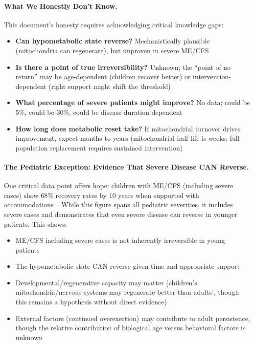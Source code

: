 \paragraph{What We Honestly Don't Know.}

This document's honesty requires acknowledging critical knowledge gaps:

\begin{itemize}
    \item \textbf{Can hypometabolic state reverse?} Mechanistically plausible (mitochondria can regenerate), but unproven in severe ME/CFS

    \item \textbf{Is there a point of true irreversibility?} Unknown; the ``point of no return'' may be age-dependent (children recover better) or intervention-dependent (right support might shift the threshold)

    \item \textbf{What percentage of severe patients might improve?} No data; could be 5\%, could be 30\%, could be disease-duration dependent

    \item \textbf{How long does metabolic reset take?} If mitochondrial turnover drives improvement, expect months to years (mitochondrial half-life is weeks; full population replacement requires sustained intervention)
\end{itemize}

\paragraph{The Pediatric Exception: Evidence That Severe Disease CAN Reverse.}

One critical data point offers hope: children with ME/CFS (including severe cases) show 68\% recovery rates by 10 years when supported with accommodations~\cite{Rowe2019pediatric}. While this figure spans all pediatric severities, it includes severe cases and demonstrates that even severe disease can reverse in younger patients. This shows:

\begin{itemize}
    \item ME/CFS including severe cases is not inherently irreversible in young patients
    \item The hypometabolic state CAN reverse given time and appropriate support
    \item Developmental/regenerative capacity may matter (children's mitochondria/nervous systems may regenerate better than adults', though this remains a hypothesis without direct evidence)
    \item External factors (continued overexertion) may contribute to adult persistence, though the relative contribution of biological age versus behavioral factors is unknown
\end{itemize}

